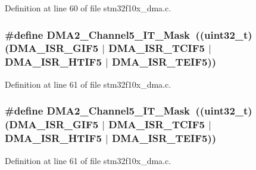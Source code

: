 Definition at line 60 of file stm32f10x\+\_\+dma.\+c.

\subsubsection[{\texorpdfstring{D\+M\+A2\+\_\+\+Channel5\+\_\+\+I\+T\+\_\+\+Mask}{DMA2_Channel5_IT_Mask}}]{\setlength{\rightskip}{0pt plus 5cm}\#define D\+M\+A2\+\_\+\+Channel5\+\_\+\+I\+T\+\_\+\+Mask~(({\bf uint32\+\_\+t})({\bf D\+M\+A\+\_\+\+I\+S\+R\+\_\+\+G\+I\+F5} $\vert$ {\bf D\+M\+A\+\_\+\+I\+S\+R\+\_\+\+T\+C\+I\+F5} $\vert$ {\bf D\+M\+A\+\_\+\+I\+S\+R\+\_\+\+H\+T\+I\+F5} $\vert$ {\bf D\+M\+A\+\_\+\+I\+S\+R\+\_\+\+T\+E\+I\+F5}))}\hypertarget{group___d_m_a___private___defines_gaedaf3e94d362754266807d6ccbab2e3e}{}\label{group___d_m_a___private___defines_gaedaf3e94d362754266807d6ccbab2e3e}


Definition at line 61 of file stm32f10x\+\_\+dma.\+c.

\subsubsection[{\texorpdfstring{D\+M\+A2\+\_\+\+Channel5\+\_\+\+I\+T\+\_\+\+Mask}{DMA2_Channel5_IT_Mask}}]{\setlength{\rightskip}{0pt plus 5cm}\#define D\+M\+A2\+\_\+\+Channel5\+\_\+\+I\+T\+\_\+\+Mask~(({\bf uint32\+\_\+t})({\bf D\+M\+A\+\_\+\+I\+S\+R\+\_\+\+G\+I\+F5} $\vert$ {\bf D\+M\+A\+\_\+\+I\+S\+R\+\_\+\+T\+C\+I\+F5} $\vert$ {\bf D\+M\+A\+\_\+\+I\+S\+R\+\_\+\+H\+T\+I\+F5} $\vert$ {\bf D\+M\+A\+\_\+\+I\+S\+R\+\_\+\+T\+E\+I\+F5}))}\hypertarget{group___d_m_a___private___defines_gaedaf3e94d362754266807d6ccbab2e3e}{}\label{group___d_m_a___private___defines_gaedaf3e94d362754266807d6ccbab2e3e}


Definition at line 61 of file stm32f10x\+\_\+dma.\+c.

